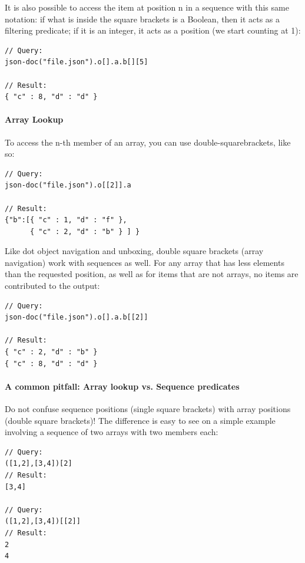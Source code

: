 It is also possible to access the item at position n in a sequence with this same notation: if what is inside the square brackets is a Boolean, then it acts as a filtering predicate; if it is an integer, it acts as a position (we start counting at 1):

\begin{lstlisting}[style=json]
// Query:
json-doc("file.json").o[].a.b[][5]

// Result:
{ "c" : 8, "d" : "d" }
\end{lstlisting}

\paragraph{Array Lookup}
To access the n-th member of an array, you can use double-squarebrackets, like so:

\begin{lstlisting}[style=json]
// Query:
json-doc("file.json").o[[2]].a

// Result:
{"b":[{ "c" : 1, "d" : "f" },
      { "c" : 2, "d" : "b" } ] }
\end{lstlisting}

Like dot object navigation and unboxing, double square brackets (array navigation) work with sequences as well. For any array that has less elements than the requested position, as well as for items that are not arrays, no items are contributed to the output:

\begin{lstlisting}[style=json]
// Query:
json-doc("file.json").o[].a.b[[2]]

// Result:
{ "c" : 2, "d" : "b" }
{ "c" : 8, "d" : "d" }
\end{lstlisting}

\paragraph{A common pitfall: Array lookup vs. Sequence predicates}
Do not confuse sequence positions (single square brackets) with array positions (double square brackets)! The difference is easy to see on a simple example involving a sequence of two arrays with two members each:

\begin{lstlisting}[style=json]
// Query:
([1,2],[3,4])[2]
// Result:
[3,4]

// Query:
([1,2],[3,4])[[2]]
// Result:
2
4
\end{lstlisting}


